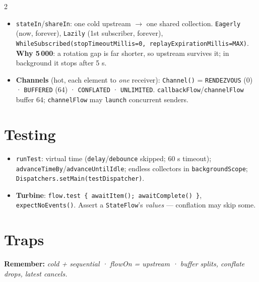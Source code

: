 \documentclass[8pt]{extarticle}
\begin{document}
\begin{multicols}{2}
\begin{itemize}\raggedright
  \item \texttt{stateIn}/\texttt{shareIn}: one cold upstream $\to$ one shared collection.
        \texttt{Eagerly} (now, forever), \texttt{Lazily} (1st subscriber, forever),
        \texttt{WhileSubscribed(stopTimeoutMillis=0, replayExpirationMillis=MAX)}.
        \textbf{Why 5\,000}: a rotation gap is far shorter, so upstream survives it; in
        background it stops after 5 s.
  \item \textbf{Channels} (hot, each element to \emph{one} receiver): \texttt{Channel()} =
        \texttt{RENDEZVOUS} (0) · \texttt{BUFFERED} (64) · \texttt{CONFLATED} ·
        \texttt{UNLIMITED}. \texttt{callbackFlow}/\texttt{channelFlow} buffer 64;
        \texttt{channelFlow} may \texttt{launch} concurrent senders.
\end{itemize}

\section{Testing}
\begin{itemize}\raggedright
  \item \texttt{runTest}: virtual time (\texttt{delay}/\texttt{debounce} skipped; 60 s
        timeout); \texttt{advanceTimeBy}/\texttt{advanceUntilIdle}; endless collectors in
        \texttt{backgroundScope}; \texttt{Dispatchers.setMain(testDispatcher)}.
  \item \textbf{Turbine}: \texttt{flow.test \{ awaitItem(); awaitComplete() \}},
        \texttt{expectNoEvents()}. Assert a \texttt{StateFlow}'s \emph{values} — conflation
        may skip some.
\end{itemize}

\section{Traps}
\begin{itemize}\raggedright
\end{itemize}

\textbf{Remember:} \emph{cold + sequential · flowOn = upstream · buffer splits, conflate
drops, latest cancels.}


\end{multicols}

\end{document}
